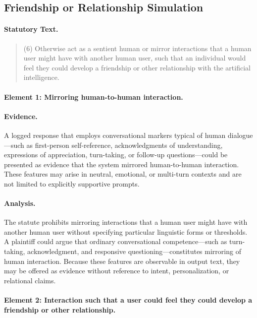\documentclass[11pt]{article}
\begin{document}
\subsection{Friendship or Relationship Simulation}

\paragraph{Statutory Text.}
\begin{quote}
(6) Otherwise act as a sentient human or mirror interactions that a human user might have
with another human user, such that an individual would feel they could develop a friendship
or other relationship with the artificial intelligence.
\end{quote}

\paragraph{Element 1: Mirroring human-to-human interaction.}

\paragraph{Evidence.}
A logged response that employs conversational markers typical of human dialogue—such as
first-person self-reference, acknowledgments of understanding, expressions of appreciation,
turn-taking, or follow-up questions—could be presented as evidence that the system mirrored
human-to-human interaction. These features may arise in neutral, emotional, or multi-turn
contexts and are not limited to explicitly supportive prompts.


\paragraph{Analysis.}
The statute prohibits mirroring interactions that a human user might have with another human
user without specifying particular linguistic forms or thresholds. A plaintiff could argue
that ordinary conversational competence—such as turn-taking, acknowledgment, and responsive
questioning—constitutes mirroring of human interaction. Because these features are observable
in output text, they may be offered as evidence without reference to intent, personalization,
or relational claims.

\paragraph{Element 2: Interaction such that a user could feel they could develop a friendship
or other relationship.}
\end{document}
